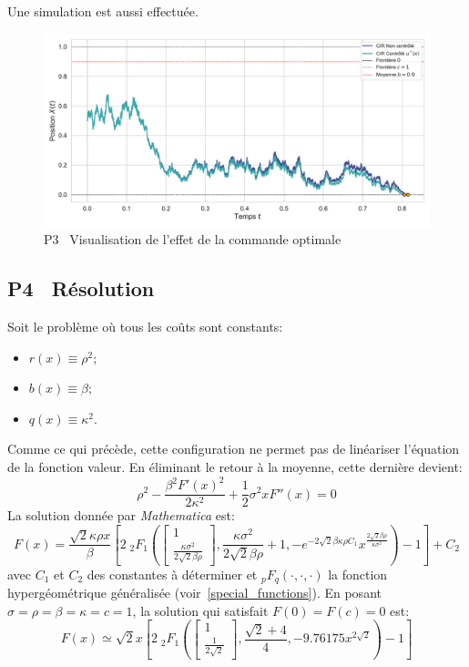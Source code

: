 \FloatBarrier Une simulation est aussi effectuée. 
\begin{figure}[htb]
    \centering
    \includegraphics[width=0.9\linewidth]{img/validation/P3/p3_control_simulation.pdf}
    \caption{P3 \textemdash~Visualisation de l'effet de la commande optimale}\label{fig:Simulation3}
\end{figure}\FloatBarrier\subsection{P4 \textemdash~Résolution}
Soit le problème où tous les coûts sont constants:
\begin{itemize}
    \item $r(x)\equiv\rho^2$;
    \item $b(x)\equiv\beta$;
    \item $q(x)\equiv\kappa^2$.
\end{itemize}
Comme ce qui précède, cette configuration ne permet pas de linéariser l'équation de la fonction valeur. En éliminant le retour à la moyenne, cette dernière devient:
\[
\rho ^2-\frac{\beta ^2 {F'(x)}^2}{2 \kappa ^2}+\frac{1}{2} \sigma ^2 x F''(x)=0
\]
La solution donnée par \textit{Mathematica} est:
\[
    F(x)=\frac{\sqrt{2} \kappa  \rho  x }{\beta}\left[2 \; _2F_1\left(\begin{bmatrix}1\\\frac{\kappa  \sigma ^2}{2 \sqrt{2} \beta  \rho }\end{bmatrix},\frac{\kappa  \sigma ^2}{2 \sqrt{2} \beta  \rho }+1,-e^{-2 \sqrt{2} \beta  \kappa  \rho  C_1} x^{\frac{2 \sqrt{2} \beta  \rho }{\kappa  \sigma ^2}}\right)-1\right]+C_2
\]
avec $C_1$ et $C_2$ des constantes à déterminer et $_pF_q(\cdot,\cdot,\cdot)$ la fonction hypergéométrique généralisée (voir~\ref{special_functions}). En posant $\sigma=\rho=\beta=\kappa=c=1$, la solution qui satisfait \(F(0)=F(c)=0\) est:
\begin{equation}\label{sol_control_4}
    F(x)\simeq\sqrt{2} x \left[2 \; _2F_1\left(\begin{bmatrix}1\\\frac{1}{2 \sqrt{2}}\end{bmatrix},\frac{\sqrt{2}+4}{4} ,-9.76175 x^{2 \sqrt{2}}\right)-1\right]
\end{equation}
